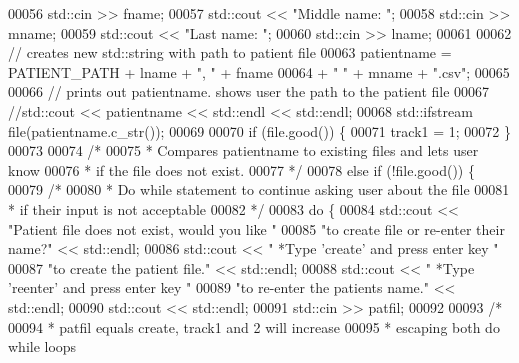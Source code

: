 \begin{DoxyCode}
00056             std::cin >> fname;
00057             std::cout << \textcolor{stringliteral}{"Middle name: "};
00058             std::cin >> mname;
00059             std::cout << \textcolor{stringliteral}{"Last name: "};
00060             std::cin >> lname;
00061 
00062             \textcolor{comment}{// creates new std::string with path to patient file}
00063             patientname = PATIENT\_PATH + lname + \textcolor{stringliteral}{", "} + fname
00064                 + \textcolor{stringliteral}{" "} + mname + \textcolor{stringliteral}{".csv"};
00065 
00066             \textcolor{comment}{// prints out patientname. shows user the path to the patient file}
00067             \textcolor{comment}{//std::cout << patientname << std::endl << std::endl;}
00068             std::ifstream file(patientname.c\_str());
00069 
00070             \textcolor{keywordflow}{if} (file.good()) \{
00071                 track1 = 1;
00072             \}
00073 
00074             \textcolor{comment}{/*}
00075 \textcolor{comment}{             * Compares patientname to existing files and lets user know}
00076 \textcolor{comment}{             * if the file does not exist.}
00077 \textcolor{comment}{             */}
00078             \textcolor{keywordflow}{else} \textcolor{keywordflow}{if} (!file.good()) \{
00079                 \textcolor{comment}{/* }
00080 \textcolor{comment}{                 * Do while statement to continue asking user about the file}
00081 \textcolor{comment}{                 * if their input is not acceptable}
00082 \textcolor{comment}{                 */} 
00083                 \textcolor{keywordflow}{do} \{
00084                     std::cout << \textcolor{stringliteral}{"Patient file does not exist, would you like "}
00085                         \textcolor{stringliteral}{"to create file or re-enter their name?"} << std::endl;
00086                     std::cout << \textcolor{stringliteral}{"  *Type 'create' and press enter key "}
00087                         \textcolor{stringliteral}{"to create the patient file."} << std::endl;
00088                     std::cout << \textcolor{stringliteral}{"  *Type 'reenter' and press enter key "}
00089                         \textcolor{stringliteral}{"to re-enter the patients name."} << std::endl;
00090                     std::cout << std::endl;
00091                     std::cin >> patfil;
00092 
00093                     \textcolor{comment}{/* }
00094 \textcolor{comment}{                     * patfil equals create, track1 and 2 will increase}
00095 \textcolor{comment}{                     * escaping both do while loops}

\end{DoxyCode}
